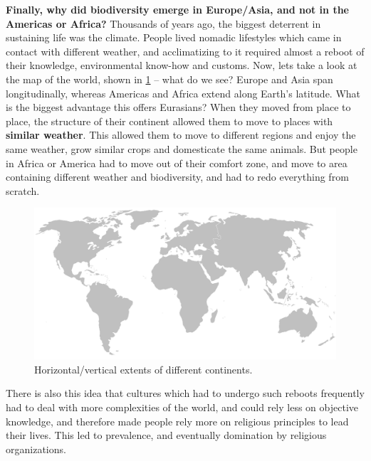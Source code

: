 \textbf{Finally, why did biodiversity emerge in Europe/Asia, and not in the Americas or Africa?} Thousands of years ago, the biggest deterrent in sustaining life was the climate. People lived nomadic lifestyles which came in contact with different weather, and acclimatizing to it required almost a reboot of their knowledge, environmental know-how and customs. Now, lets take a look at the map of the world, shown in \ref{fig:continental-axis} -- what do we see? Europe and Asia span longitudinally, whereas Americas and Africa extend along Earth's latitude. What is the biggest advantage this offers Eurasians? When they moved from place to place, the structure of their continent allowed them to move to places with \textbf{similar weather}. This allowed them to move to different regions and enjoy the same weather, grow similar crops and domesticate the same animals. But people in Africa or America had to move out of their comfort zone, and move to area containing different weather and biodiversity, and had to redo everything from scratch.

\begin{figure}[t]
\centering
\includegraphics[width=\textwidth]{media/chapter2/continents.png}
\caption{Horizontal/vertical extents of different continents.}
\label{fig:continental-axis}
\end{figure}

There is also this idea that cultures which had to undergo such reboots frequently had to deal with more complexities of the world, and could rely less on objective knowledge, and therefore made people rely more on religious principles to lead their lives. This led to prevalence, and eventually domination by religious organizations.



